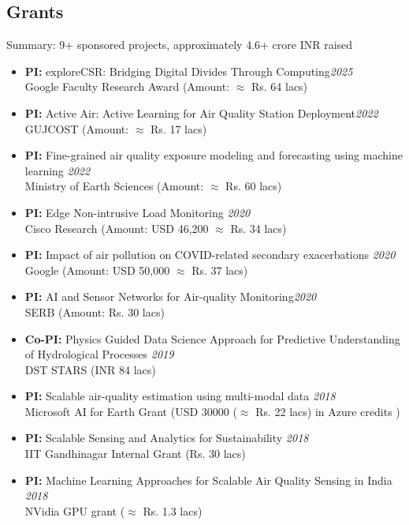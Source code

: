 \documentclass[letter,10pt]{article}
\begin{document}
\subsection*{\textbf{Grants}}
\vspace{-0.4em}
Summary: 9+ sponsored projects, approximately 4.6+ crore INR raised
\begin{itemize}
    \item[]{\textbf{PI: }exploreCSR: Bridging Digital Divides Through Computing}\hfill\textit{2025} \\
        Google Faculty Research Award (Amount: $\approx$ Rs. 64 lacs)
 \ifcvshort\else
 \item[]{\textbf{PI: }Active Air: Active Learning for Air Quality Station Deployment}\hfill\textit{2022} \\
        GUJCOST (Amount: $\approx$ Rs. 17 lacs)
 \fi
      \item[]{\textbf{PI: }Fine-grained air quality exposure modeling and forecasting using machine learning }\hfill\textit{2022} \\
        Ministry of Earth Sciences (Amount: $\approx$ Rs. 60 lacs)
    \item[]{\textbf{PI: }Edge Non-intrusive Load Monitoring  }\hfill\textit{2020} \\
    Cisco Research (Amount: USD 46,200 $\approx$ Rs. 34 lacs)
    \item[]{\textbf{PI: }Impact of air pollution on COVID-related secondary exacerbations  }\hfill\textit{2020} \\
    Google (Amount: USD 50,000 $\approx$ Rs. 37 lacs)
    \ifcvshort\else
    \item[]{\textbf{PI: }AI and Sensor Networks for Air-quality Monitoring}\hfill\textit{2020} \\
    SERB (Amount: Rs. 30 lacs)
    
    \item[]{\textbf{Co-PI: }Physics Guided Data Science Approach for Predictive Understanding of Hydrological Processes }\hfill\textit{2019}\\
    DST STARS (INR 84 lacs)
    \item[]{\textbf{PI: }Scalable air-quality estimation using multi-modal data \hfill\textit{2018}\\Microsoft AI for Earth Grant (USD 30000 ($\approx$ Rs. 22 lacs) in Azure credits )} 
    \item[]{\textbf{PI: }Scalable Sensing and Analytics for Sustainability \hfill\textit{2018} \\
    IIT Gandhinagar Internal Grant (Rs. 30 lacs)} 
    \item[]{\textbf{PI: }Machine Learning Approaches for Scalable Air Quality Sensing in India} \hfill\textit{2018}\\
    NVidia GPU grant ($\approx$ Rs. 1.3 lacs)
    \fi
\end{itemize}
\end{document}
